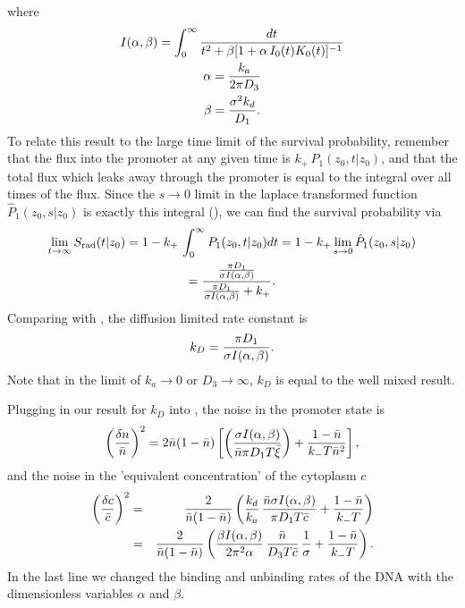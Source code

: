 where
\begin{gather}
 I(\alpha,\beta) = \int_0^{\infty} \frac{dt}{t^2 + \beta[1 + \alpha \, I_0(t) K_0(t)]^{-1}} \\
 \alpha = \frac{k_a}{2 \pi D_3} \elabel{EqAlpha} \\
 \beta = \frac{\sigma^2 k_d}{D_1} \elabel{EqBeta}.
\end{gather}
To relate this result to the large time limit of the survival probability, remember that the flux into the promoter at any given time is $k_+\,P_1(z_0,t|z_0)$, and that the total flux which leaks away through the promoter is equal to the integral over all times of the flux. Since the $s \to 0$ limit in the laplace transformed function $\hat{P}_1(z_0,s|z_0)$ is exactly this integral (), we can find the survival probability via
\begin{gather}
  \lim_{t \to \infty}S_{\rm rad}(t|z_0) = 1 - k_+ \, \int_0^{\infty} P_1(z_0, t|z_0) dt = 1 - k_+ \lim_{s \to 0} \hat{P}_1(z_0, s|z_0) \\
= \frac{\frac{\pi D_1}{\sigma I(\alpha,\beta)}}{\frac{\pi D_1}{\sigma I(\alpha,\beta)} + k_+}.
\end{gather}
Comparing with , the diffusion limited rate constant is
\begin{equation}
 k_D = \frac{\pi D_1}{\sigma I(\alpha,\beta)}.
 \elabel{kDFullJ}
\end{equation}
Note that in the limit of $k_a\to0$ or $D_3\to\infty$, $k_D$ is equal to the well mixed result.

Plugging in our result for $k_D$ into , the noise in the promoter state is
\begin{equation}
 \elabel{NoiseProFull}
 \left( \frac{\delta n}{\bar{n}} \right)^2 = 2 \bar{n}(1-\bar{n})\left[\left( \frac{\sigma I(\alpha,\beta)}{\bar{n} \pi D_1 T \bar{\xi}} \right)+\frac{1-\bar{n}}{k_- T \bar{n}^2} \right],
\end{equation}
and the noise in the 'equivalent concentration' of the cytoplasm $c$
\begin{eqnarray}
 \elabel{NoiseCFull} 
 \left( \frac{\delta c}{\bar{c}} \right)^2 & = & \frac{2}{\bar{n}(1-\bar{n})} \left( \frac{k_d}{k_a} \, \frac{\bar{n} \sigma I(\alpha,\beta)}{\pi D_1 T \bar{c}} + \frac{1-\bar{n}}{k_- T}  \right) \\
 \elabel{NoiseCFull2}
 & = & \frac{2}{\bar{n}(1-\bar{n})} \left( \frac{\beta I(\alpha,\beta)}{2 \pi^2 \alpha} \, \frac{\bar{n}}{D_3 T \bar{c}} \, \frac{1}{\sigma} + \frac{1-\bar{n}}{k_- T}  \right).
\end{eqnarray}
In the last line we changed the binding and unbinding rates of the DNA with the dimensionless variables $\alpha$ and $\beta$.


